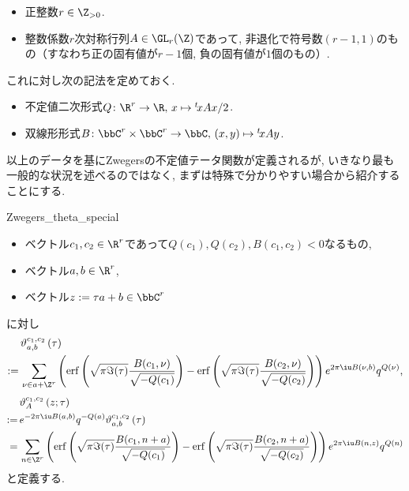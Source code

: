 \documentclass[11pt,b5paper,oneside,lualatex]{ltjsarticle} %
\DeclareMathOperator{\erf}{erf}
\numberwithin{equation}{section} %
\begin{document}
\begin{symb}{}{}
	\begin{itemize}
		\item 正整数$ r \in \Z_{>0} $.
		\item 整数係数$ r $次対称行列$ A \in \GL_r(\Z) $であって, 非退化で符号数$ (r-1, 1) $のもの（すなわち正の固有値が$ r-1 $個, 負の固有値が$ 1 $個のもの）.
	\end{itemize}
\end{symb}

これに対し次の記法を定めておく. 

\begin{nota}{}{}
	\begin{itemize}
		\item 不定値二次形式$ Q \colon \R^r \to \R, \, x \mapsto {}^t\!x A x /2 $.
		\item 双線形形式$ B \colon \bbC^r \times \bbC^r \to \bbC, \, (x, y) \mapsto {}^t\!x A y $.
	\end{itemize}
\end{nota}

以上のデータを基にZwegersの不定値テータ関数が定義されるが, いきなり最も一般的な状況を述べるのではなく, まずは特殊で分かりやすい場合から紹介することにする. 

\begin{dfn}{}{Zwegers_theta_special}
	\leavevmode %
	\begin{itemize}
		\item ベクトル$ c_1, c_2 \in \R^r $であって$ Q(c_1), Q(c_2), B(c_1, c_2) < 0 $なるもの,
		\item ベクトル$ a, b \in \R^r $,
		\item ベクトル$ z := \tau a + b \in \bbC^r $
	\end{itemize}
	に対し	
	\begin{align}
		&\vartheta_{a, b}^{c_1, c_2} \left( \tau \right)
		\\
		:= \,
		&\sum_{\nu \in a + \Z^r}
		\left( \erf \left( \sqrt{\pi \Im(\tau)} \frac{B(c_1, \nu)}{\sqrt{-Q(c_1)}} \right) - \erf \left( \sqrt{\pi \Im(\tau)} \frac{B(c_2, \nu)}{\sqrt{-Q(c_2)}} \right) \right)
		e^{2\pi \iu B(\nu, b)} q^{Q(\nu)},
	\end{align}
	\begin{align}
		&\vartheta_{A}^{c_1, c_2} \left( z; \tau \right)
		\\
		:= \,
		&e^{-2\pi \iu B(a, b)} q^{-Q(a)} \vartheta_{a, b}^{c_1, c_2} \left( \tau \right)
		\\
		= \,
		&\sum_{n \in \Z^r}
		\left( \erf \left( \sqrt{\pi \Im(\tau)} \frac{B(c_1, n + a)}{\sqrt{-Q(c_1)}} \right) - \erf \left( \sqrt{\pi \Im(\tau)} \frac{B(c_2, n + a)}{\sqrt{-Q(c_2)}} \right) \right)
		e^{2\pi \iu B(n, z)} q^{Q(n)}
	\end{align}
	と定義する. 
\end{dfn}
\end{document}
